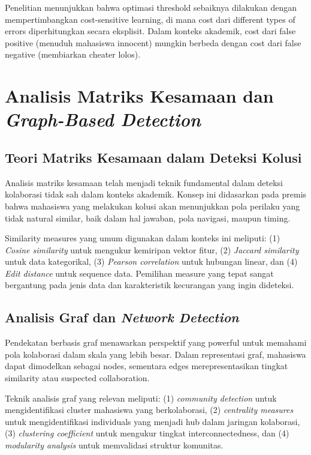 Penelitian menunjukkan bahwa optimasi threshold sebaiknya dilakukan dengan mempertimbangkan cost-sensitive learning, di mana cost dari different types of errors diperhitungkan secara eksplisit. Dalam konteks akademik, cost dari false positive (menuduh mahasiswa innocent) mungkin berbeda dengan cost dari false negative (membiarkan cheater lolos).

\section{Analisis Matriks Kesamaan dan \textit{Graph-Based Detection}}
\label{sec:similarityAnalysis}

\subsection{Teori Matriks Kesamaan dalam Deteksi Kolusi}

Analisis matriks kesamaan telah menjadi teknik fundamental dalam deteksi kolaborasi tidak sah dalam konteks akademik. Konsep ini didasarkan pada premis bahwa mahasiswa yang melakukan kolusi akan menunjukkan pola perilaku yang tidak natural similar, baik dalam hal jawaban, pola navigasi, maupun timing.

Similarity measures yang umum digunakan dalam konteks ini meliputi: (1) \textit{Cosine similarity} untuk mengukur kemiripan vektor fitur, (2) \textit{Jaccard similarity} untuk data kategorikal, (3) \textit{Pearson correlation} untuk hubungan linear, dan (4) \textit{Edit distance} untuk sequence data. Pemilihan measure yang tepat sangat bergantung pada jenis data dan karakteristik kecurangan yang ingin dideteksi.

\subsection{Analisis Graf dan \textit{Network Detection}}

Pendekatan berbasis graf menawarkan perspektif yang powerful untuk memahami pola kolaborasi dalam skala yang lebih besar. Dalam representasi graf, mahasiswa dapat dimodelkan sebagai nodes, sementara edges merepresentasikan tingkat similarity atau suspected collaboration.

Teknik analisis graf yang relevan meliputi: (1) \textit{community detection} untuk mengidentifikasi cluster mahasiswa yang berkolaborasi, (2) \textit{centrality measures} untuk mengidentifikasi individuals yang menjadi hub dalam jaringan kolaborasi, (3) \textit{clustering coefficient} untuk mengukur tingkat interconnectedness, dan (4) \textit{modularity analysis} untuk memvalidasi struktur komunitas.


